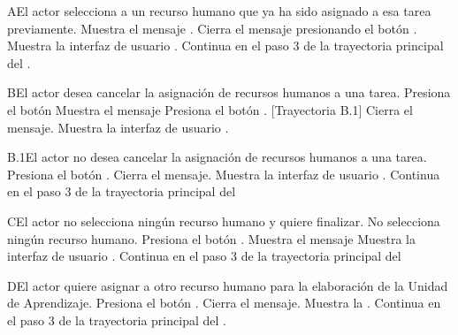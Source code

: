 
\begin{UCtrayectoriaA}{A}{El actor selecciona a un recurso humano que ya ha sido asignado a esa tarea previamente.}
    \UCpaso Muestra el mensaje .
    \UCpaso[\UCactor] Cierra el mensaje presionando el botón .
    \UCpaso Muestra la interfaz de usuario .
    \UCpaso Continua en el paso 3 de la trayectoria principal del .
\end{UCtrayectoriaA}


\begin{UCtrayectoriaA}{B}{El actor desea cancelar la asignación de recursos humanos a una tarea.}
    \UCpaso[\UCactor] Presiona el botón 
    \UCpaso Muestra el mensaje 
    \UCpaso[\UCactor] Presiona el botón . [Trayectoria B.1]
    \UCpaso Cierra el mensaje.
    \UCpaso Muestra la interfaz de usuario .
\end{UCtrayectoriaA}


\begin{UCtrayectoriaA}{B.1}{El actor no desea cancelar la asignación de recursos humanos a una tarea.}
    \UCpaso[\UCactor] Presiona el botón .
    \UCpaso Cierra el mensaje.
    \UCpaso Muestra la interfaz de usuario .
    \UCpaso Continua en el paso 3 de la trayectoria principal del 
\end{UCtrayectoriaA}


\begin{UCtrayectoriaA}{C}{El actor no selecciona ningún recurso humano y quiere finalizar.}
    \UCpaso[\UCactor] No selecciona ningún recurso humano.
    \UCpaso[\UCactor] Presiona el botón .
    \UCpaso Muestra el mensaje 
    \UCpaso Muestra la interfaz de usuario .
    \UCpaso Continua en el paso 3 de la trayectoria principal del 
\end{UCtrayectoriaA}


\begin{UCtrayectoriaA}{D}{El actor quiere asignar a otro recurso humano para la elaboración de la Unidad de Aprendizaje.}
    \UCpaso[\UCactor] Presiona el botón .
    \UCpaso Cierra el mensaje.
    \UCpaso Muestra la .
    \UCpaso Continua en el paso 3 de la trayectoria principal del .
\end{UCtrayectoriaA}